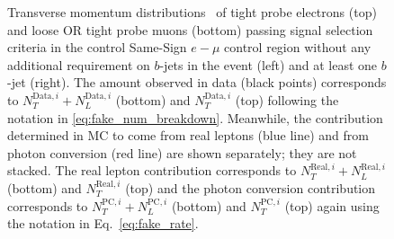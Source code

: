 \begin{figure}[ht]
{}
\caption{Transverse momentum distributions \pt\ of tight probe 
electrons (top) and loose OR tight probe muons (bottom) passing signal 
selection criteria in the control Same-Sign $e-\mu$ control region 
without any additional requirement on $b$-jets in the event (left) and 
at least one $b$-jet (right). 
The amount observed in data (black points) corresponds 
to $N_T^{\textrm{Data},i}+N_L^{\textrm{Data},i}$ (bottom) and $N_T^{\textrm{Data},i}$ (top) following the notation
in \eqn\ref{eq:fake_num_breakdown}.
Meanwhile, the contribution determined in MC to come from 
real leptons (blue line) and from photon conversion (red line) are shown 
separately; they are not stacked. The real lepton contribution corresponds to 
$N_T^{\textrm{Real},i}+N_L^{\textrm{Real},i}$ (bottom) and $N_T^{\textrm{Real},i}$ 
(top) and the photon conversion 
contribution 
corresponds to $N_T^{\textrm{PC},i}+N_L^{\textrm{PC},i}$ (bottom) 
and $N_T^{\textrm{PC},i}$ (top) again using the notation 
in Eq.~\ref{eq:fake_rate}. }


\label{fig:fakeEff_CRs_electron}
\end{figure}

